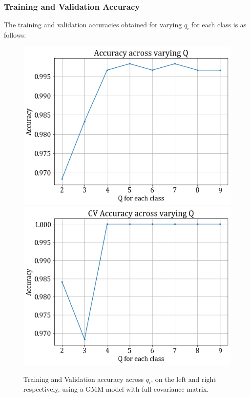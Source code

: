 \documentclass[11pt,a4paper]{article}
\begin{document}
\subsubsection{Training and Validation Accuracy}
The training and validation accuracies obtained for varying $q_i$ for each class is as follows:
\begin{figure}[H]
    \hspace{-2em}
    \includegraphics[scale=0.45]{images/1b_full_train.png}
    \includegraphics[scale=0.45]{images/1b_full_val.png}
    \caption{Training and Validation accuracy across $q_i$, on the left and right respectively, using a GMM model with full covariance matrix.}
\end{figure}
\end{document}
